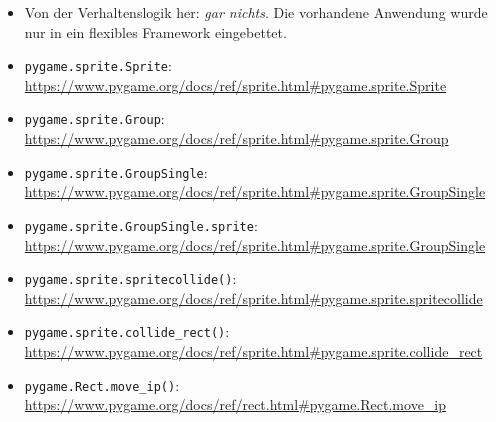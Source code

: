 \begin{itemize}
    \item Von der Verhaltenslogik her: \emph{gar nichts}. Die vorhandene Anwendung wurde nur in ein flexibles Framework eingebettet. 

	\item \texttt{pygame.sprite.Sprite}:
	\\
	\url{https://www.pygame.org/docs/ref/sprite.html#pygame.sprite.Sprite}
	
	\item \texttt{pygame.sprite.Group}:
    \\
    \url{https://www.pygame.org/docs/ref/sprite.html#pygame.sprite.Group}

	\item \texttt{pygame.sprite.GroupSingle}:
    \\
    \url{https://www.pygame.org/docs/ref/sprite.html#pygame.sprite.GroupSingle}

	\item \texttt{pygame.sprite.GroupSingle.sprite}:
    \\
    \url{https://www.pygame.org/docs/ref/sprite.html#pygame.sprite.GroupSingle}

	\item \texttt{pygame.sprite.spritecollide()}:
    \\
    \url{https://www.pygame.org/docs/ref/sprite.html#pygame.sprite.spritecollide}

	\item \texttt{pygame.sprite.collide\_rect()}:
    \\
    \url{https://www.pygame.org/docs/ref/sprite.html#pygame.sprite.collide_rect}

	\item \texttt{pygame.Rect.move\_ip()}:
    \\
     \url{https://www.pygame.org/docs/ref/rect.html#pygame.Rect.move_ip}
    
\end{itemize}

